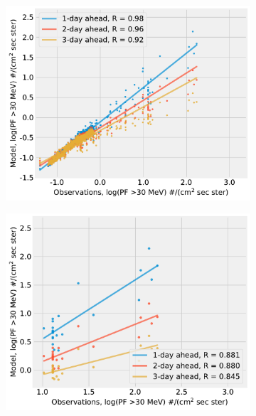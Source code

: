 \begin{figure}[htp]
    \begin{subfigure}{0.4\textwidth}
         \centering
         \includegraphics[width=\textwidth]{chapter4/figs/scatterplot_obs_vs_model_tstset_3in1_log_PF30.pdf}
    \end{subfigure}
    \begin{subfigure}{0.4\textwidth}
         \centering
         \includegraphics[width=\textwidth]{chapter4/figs/scatterplot_obs_vs_model_tstset_3in1_LOG_PF_LT1_log_PF30.pdf}
    \end{subfigure}
    \begin{subfigure}{0.4\textwidth}

\end{subfigure}
\end{figure}
